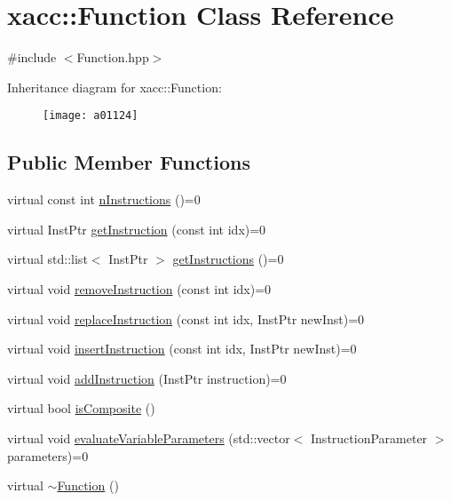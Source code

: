 \hypertarget{a01124}{}\section{xacc\+:\+:Function Class Reference}
\label{a01124}


{\ttfamily \#include $<$Function.\+hpp$>$}

Inheritance diagram for xacc\+:\+:Function\+:\begin{figure}[H]
\begin{center}
\leavevmode
\texttt{[image: a01124]}
\end{center}
\end{figure}
\subsection*{Public Member Functions}
\begin{DoxyCompactItemize}
\item 
virtual const int \hyperlink{a01124_a8901985525f59713e14c61713e07c086}{n\+Instructions} ()=0
\item 
virtual Inst\+Ptr \hyperlink{a01124_afa549fc91b5a05f26d8139954a7e0ed5}{get\+Instruction} (const int idx)=0
\item 
virtual std\+::list$<$ Inst\+Ptr $>$ \hyperlink{a01124_aaf80bd3d49113a92b520785572663032}{get\+Instructions} ()=0
\item 
virtual void \hyperlink{a01124_ab6478b09bb28e194bb555b3180737733}{remove\+Instruction} (const int idx)=0
\item 
virtual void \hyperlink{a01124_a2ef6a4923a6734f90f6ee3d94d263af0}{replace\+Instruction} (const int idx, Inst\+Ptr new\+Inst)=0
\item 
virtual void \hyperlink{a01124_acde702e44bdbc2759b338365218d7ebe}{insert\+Instruction} (const int idx, Inst\+Ptr new\+Inst)=0
\item 
virtual void \hyperlink{a01124_aa8c9ec2d08be75c69399d4254b0216f5}{add\+Instruction} (Inst\+Ptr instruction)=0
\item 
virtual bool \hyperlink{a01124_aa75500c657b5c3e0e36213e1506aad97}{is\+Composite} ()
\item 
virtual void \hyperlink{a01124_af6ae9453027789a2aaec30e59c9e45e3}{evaluate\+Variable\+Parameters} (std\+::vector$<$ Instruction\+Parameter $>$ parameters)=0
\item 
virtual \hyperlink{a01124_a04b25ba4da1ddfa4ec4ec6d6ffb25bc3}{$\sim$\+Function} ()
\end{DoxyCompactItemize}

